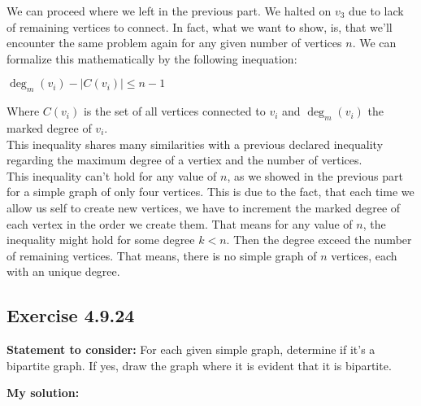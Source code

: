 \documentclass{report}
\newcommand{\cent}[1]{\begin{center}#1\end{center}}
\newcommand{\assignmentDescription}{\textbf{Statement to consider: }}
\newcommand{\solution}{\textbf{My solution: }}
\newcommand{\Exercise}[1]{\subsection{Exercise #1}}
\newcommand{\defaultEnumerateLabel}{\textbf{\alph*.}}
\begin{document}
\begin{enumerate}[label=\defaultEnumerateLabel]
		We can proceed where we left in the previous part. We halted on $v_3$ due to lack of remaining vertices to connect. In fact, what we want to show, is, that we'll encounter the same problem again for any given number of vertices $n$. We can formalize this mathematically by the following inequation:
		
		\cent{$\deg_m(v_i) - | C(v_i)| \leq n -1$}
		
		Where $C(v_i)$ is the set of all vertices connected to $v_i$ and $\deg_m(v_i)$ the marked degree of $v_i$.\\
		
		This inequality shares many similarities with a previous declared inequality regarding the maximum degree of a vertiex and the number of vertices.\\
		
		This inequality can't hold for any value of $n$, as we showed in the previous part for a simple graph of only four vertices. This is due to the fact, that each time we allow us self to create new vertices, we have to increment the marked degree of each vertex in the order we create them. That means for any value of $n$, the inequality might hold for some degree $k < n$. Then the degree exceed the number of remaining vertices. That means, there is no simple graph of $n$ vertices, each with an unique degree.
		
	\end{enumerate}
	
	\Exercise{4.9.24}
	
	\assignmentDescription
	For each given simple graph, determine if it's a bipartite graph. If yes, draw the graph where it is evident that it is bipartite.
	
	\solution
	
\end{document}
